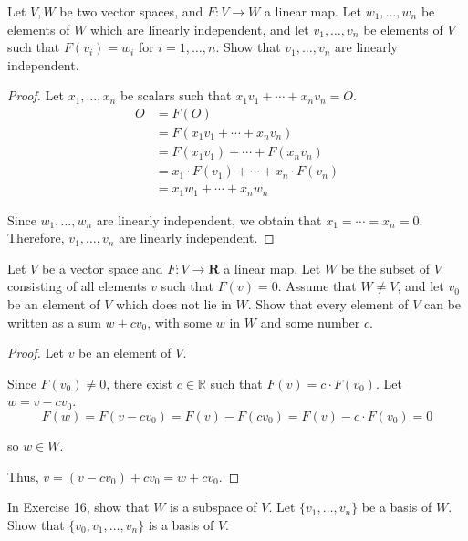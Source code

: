 \begin{exercise}
    Let $V, W$ be two vector spaces, and $F: V \to W$ a linear map. Let $w_{1}, \ldots, w_{n}$ be elements of $W$ which are linearly independent, and let $v_{1}, \ldots, v_{n}$ be elements of $V$ such that $F(v_{i}) = w_{i}$ for $i = 1,\ldots, n$. Show that $v_{1}, \ldots, v_{n}$ are linearly independent.
\end{exercise}

\begin{proof}
    Let $x_{1}, \ldots, x_{n}$ be scalars such that $x_{1}v_{1} + \cdots + x_{n}v_{n} = O$.
    \begin{align*}
        O & = F(O)                                               \\
          & = F(x_{1}v_{1} + \cdots + x_{n}v_{n})                \\
          & = F(x_{1}v_{1}) + \cdots + F(x_{n}v_{n})             \\
          & = x_{1}\cdot F(v_{1}) + \cdots + x_{n}\cdot F(v_{n}) \\
          & = x_{1}w_{1} + \cdots + x_{n}w_{n}
    \end{align*}

    Since $w_{1},\ldots, w_{n}$ are linearly independent, we obtain that $x_{1} = \cdots = x_{n} = 0$. Therefore, $v_{1}, \ldots, v_{n}$ are linearly independent.
\end{proof}

\begin{exercise}
    Let $V$ be a vector space and $F: V \to \mathbf{R}$ a linear map. Let $W$ be the subset of $V$ consisting of all elements $v$ such that $F(v) = 0$. Assume that $W \ne V$, and let $v_{0}$ be an element of $V$ which does not lie in $W$. Show that every element of $V$ can be written as a sum $w + cv_{0}$, with some $w$ in $W$ and some number $c$.
\end{exercise}

\begin{proof}
    Let $v$ be an element of $V$.

    Since $F(v_{0}) \ne 0$, there exist $c\in\mathbb{R}$ such that $F(v) = c\cdot F(v_{0})$. Let $w = v - cv_{0}$.
    \[
        F(w) = F(v - cv_{0}) = F(v) - F(cv_{0}) = F(v) - c\cdot F(v_{0}) = 0
    \]

    so $w\in W$.

    Thus, $v = (v - cv_{0}) + cv_{0} = w + cv_{0}$.
\end{proof}

\begin{exercise}
    In Exercise 16, show that $W$ is a subspace of $V$. Let $\{ v_{1}, \ldots, v_{n} \}$ be a basis of $W$. Show that $\{ v_{0}, v_{1}, \ldots, v_{n} \}$ is a basis of $V$.
\end{exercise}

